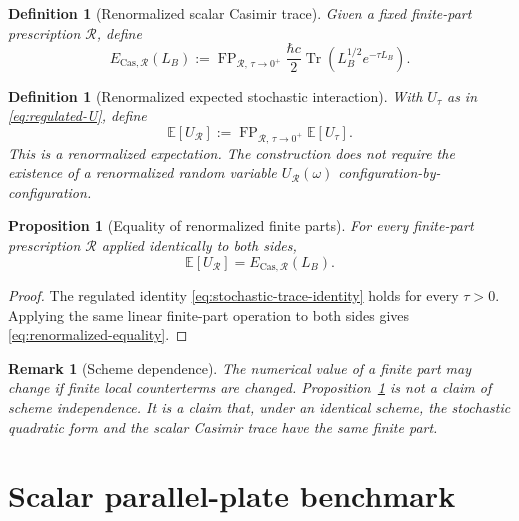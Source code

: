 \documentclass[11pt]{article}
\newtheorem{proposition}[theorem]{Proposition}
\newtheorem{definition}[theorem]{Definition}
\newtheorem{remark}[theorem]{Remark}
\newcommand{\E}{\mathbb{E}}
\newcommand{\Tr}{\operatorname{Tr}}
\newcommand{\FP}{\operatorname{FP}}
\begin{document}
\begin{definition}[Renormalized scalar Casimir trace]
Given a fixed finite-part prescription $\mathcal{R}$, define
\begin{equation}
    E_{\mathrm{Cas},\mathcal{R}}(L_B)
    :=\FP_{\mathcal{R},\,\tau\to0^+}
    \frac{\hbar c}{2}\Tr\left(L_B^{1/2}e^{-\tau L_B}\right).
    \label{eq:renorm-casimir}
\end{equation}
\end{definition}

\begin{definition}[Renormalized expected stochastic interaction]
With $U_\tau$ as in \eqref{eq:regulated-U}, define
\begin{equation}
    \E[U_{\mathcal{R}}]
    :=\FP_{\mathcal{R},\,\tau\to0^+}\E[U_\tau].
    \label{eq:renorm-stochastic-energy}
\end{equation}
This is a renormalized expectation.  The construction does not require the existence of a renormalized random variable $U_{\mathcal{R}}(\omega)$ configuration-by-configuration.
\end{definition}

\begin{proposition}[Equality of renormalized finite parts]
\label{prop:renormalized-equality}
For every finite-part prescription $\mathcal{R}$ applied identically to both sides,
\begin{equation}
    \E[U_{\mathcal{R}}]=E_{\mathrm{Cas},\mathcal{R}}(L_B).
    \label{eq:renormalized-equality}
\end{equation}
\end{proposition}

\begin{proof}
The regulated identity \eqref{eq:stochastic-trace-identity} holds for every $\tau>0$.  Applying the same linear finite-part operation to both sides gives \eqref{eq:renormalized-equality}.
\end{proof}

\begin{remark}[Scheme dependence]
The numerical value of a finite part may change if finite local counterterms are changed.  Proposition~\ref{prop:renormalized-equality} is not a claim of scheme independence.  It is a claim that, under an identical scheme, the stochastic quadratic form and the scalar Casimir trace have the same finite part.
\end{remark}

\section{Scalar parallel-plate benchmark}
\label{sec:parallel-plates}
\end{document}
